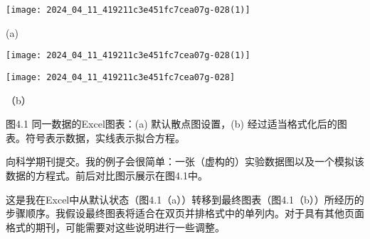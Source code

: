 \begin{center}
\texttt{[image: 2024\_04\_11\_419211c3e451fc7cea07g-028(1)]}
\end{center}

(a)

\begin{center}
\texttt{[image: 2024\_04\_11\_419211c3e451fc7cea07g-028(1)]}
\end{center}
\begin{center}
\texttt{[image: 2024\_04\_11\_419211c3e451fc7cea07g-028]}
\end{center}

（b）

图4.1 同一数据的Excel图表：(a) 默认散点图设置，(b) 经过适当格式化后的图表。符号表示数据，实线表示拟合方程。

向科学期刊提交。我的例子会很简单：一张（虚构的）实验数据图以及一个模拟该数据的方程式。前后对比图示展示在图4.1中。

这是我在Excel中从默认状态（图4.1（a））转移到最终图表（图4.1（b））所经历的步骤顺序。我假设最终图表将适合在双页并排格式中的单列内。对于具有其他页面格式的期刊，可能需要对这些说明进行一些调整。

